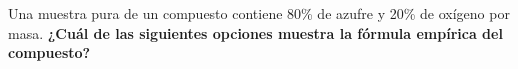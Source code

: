 Una muestra pura de un compuesto contiene 80\% de azufre y 20\% de oxígeno por masa.
\textbf{¿Cuál de las siguientes opciones muestra la fórmula empírica del compuesto?}

\begin{choices}
    \choice  {}
    \choice  {}
    \choice  {}
    \choice  {}
\end{choices}